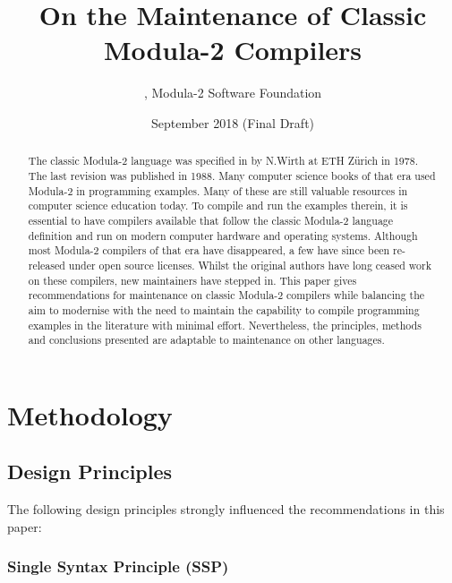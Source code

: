 \documentclass[10pt,a4paper]{article}
\title{On the Maintenance of Classic Modula-2 Compilers}
\author{\BK, Modula-2 Software Foundation}
\date{\small{September 2018 (Final Draft)}}
\makeatletter
\newcommand{\verbatimfont}[1]{\def\verbatim@font{#1}}
\makeatother
\begin{document}
\verbatimfont{\small\fontfamily{lmtt}\selectfont}
\maketitle

\begin{abstract}
The classic Modula-2 language was specified in \cite{Wirth78} by N.Wirth at
\Gls{ETH} Z\"{u}rich in 1978. The last revision \cite{Wirth88} was published in
1988. Many computer science books of that era used Modula-2 in programming
examples. Many of these are still valuable resources in computer science
education today. To compile and run the examples therein, it is essential to
have compilers available that follow the classic Modula-2 language definition
and run on modern computer hardware and operating systems. Although most
Modula-2 compilers of that era have disappeared, a few have since been
re-released under open source licenses. Whilst the original authors have long
ceased work on these compilers, new maintainers have stepped in. This paper
gives recommendations for maintenance on classic Modula-2 compilers while
balancing the aim to modernise with the need to maintain the capability to
compile programming examples in the literature with minimal effort. 
Nevertheless, the principles, methods and conclusions presented are adaptable
to maintenance on other languages.
\end{abstract}


\section{Methodology}

\subsection{Design Principles}
\label{design-principles}

The following design principles strongly influenced the recommendations in
this paper:

\subsubsection{Single Syntax Principle (SSP)}
\label{SSP}
\end{document}
